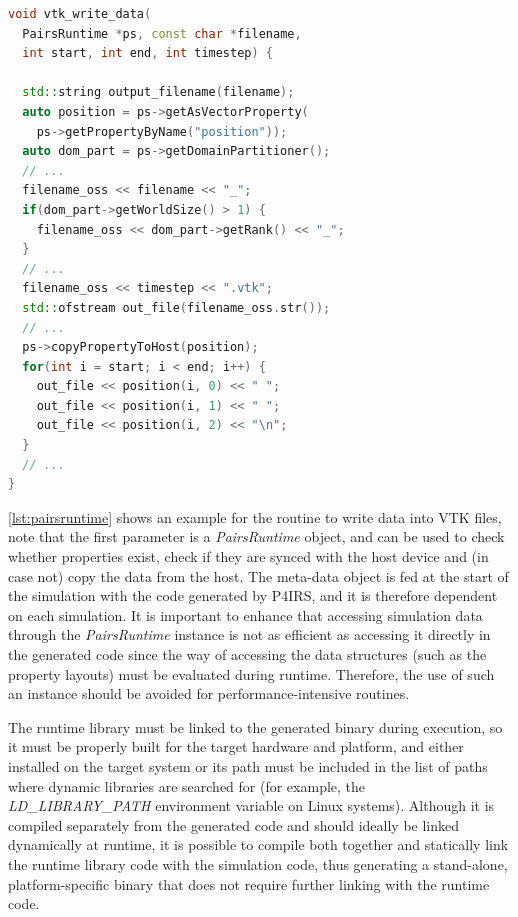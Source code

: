 \documentclass[Afour,sageh,times]{sagej}
\newcommand{\RMchange}[1]{{\color{blue} #1}}
\begin{document}
\begin{lstlisting}[language=C++,
		   label={lst:pairsruntime},
	   	   caption={P4IRS runtime routine example for writing VTK data into a file.}]
void vtk_write_data(
  PairsRuntime *ps, const char *filename,
  int start, int end, int timestep) {

  std::string output_filename(filename);
  auto position = ps->getAsVectorProperty(
    ps->getPropertyByName("position"));
  auto dom_part = ps->getDomainPartitioner();
  // ...
  filename_oss << filename << "_";
  if(dom_part->getWorldSize() > 1) {
    filename_oss << dom_part->getRank() << "_";
  }
  // ...
  filename_oss << timestep << ".vtk";
  std::ofstream out_file(filename_oss.str());
  // ...
  ps->copyPropertyToHost(position);
  for(int i = start; i < end; i++) {
    out_file << position(i, 0) << " ";
    out_file << position(i, 1) << " ";
    out_file << position(i, 2) << "\n";
  }
  // ...
}
\end{lstlisting}

\autoref{lst:pairsruntime} shows an example for the routine to write data into VTK files, note that the first parameter is a \emph{PairsRuntime} object, and can be used to check whether properties exist, check if they are synced with the host device and (in case not) copy the data from the host.
The meta-data object is \RMchange{fed} at the start of the simulation with the code generated by P4IRS, and it is therefore dependent on each simulation.
It is important to enhance that accessing simulation data through the \emph{PairsRuntime} instance is not as efficient as accessing \RMchange{it} directly in the generated code since the way of accessing the data structures (such as the property layouts) must be evaluated during runtime.
Therefore, the use of such \RMchange{an} instance \RMchange{should} be avoided for performance-intensive routines.

\RMchange{The runtime library must be linked to the generated binary during execution, so it must be properly built for the target hardware and platform, and either installed on the target system or its path must be included in the list of paths where dynamic libraries are searched for (for example, the \emph{LD\_LIBRARY\_PATH} environment variable on Linux systems).
Although it is compiled separately from the generated code and should ideally be linked dynamically at runtime, it is possible to compile both together and statically link the runtime library code with the simulation code, thus generating a stand-alone, platform-specific binary that does not require further linking with the runtime code.}
\end{document}
